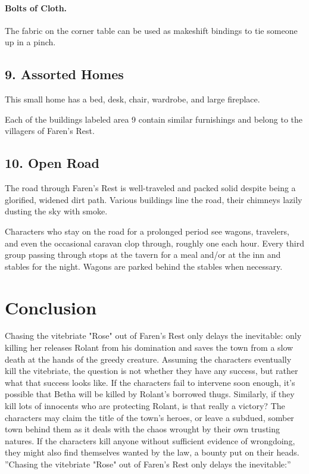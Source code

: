 \documentclass[10pt,a4paper,twoside,twocolumn,openany,bg=print,nodeprecatedcode]{dndbook}
\begin{document}
\paragraph{Bolts of Cloth.}
The fabric on the corner table can be used as makeshift bindings to tie someone up in a pinch.
\subsection{9. Assorted Homes}
\begin{DndReadAloud}{}
This small home has a bed, desk, chair, wardrobe, and large fireplace.
\end{DndReadAloud}

Each of the buildings labeled area 9 contain similar furnishings and belong to the villagers of Faren's Rest.
\subsection{10. Open Road}
\begin{DndReadAloud}{}
The road through Faren's Rest is well-traveled and packed solid despite being a glorified, widened dirt path. Various buildings line the road, their chimneys lazily dusting the sky with smoke.
\end{DndReadAloud}

Characters who stay on the road for a prolonged period see wagons, travelers, and even the occasional caravan clop through, roughly one each hour. Every third group passing through stops at the tavern for a meal and/or at the inn and stables for the night. Wagons are parked behind the stables when necessary.
\section{Conclusion}
Chasing the vitebriate "Rose" out of Faren's Rest only delays the inevitable: only killing her releases Rolant from his domination and saves the town from a slow death at the hands of the greedy creature. Assuming the characters eventually kill the vitebriate, the question is not whether they have any success, but rather what that success looks like.
If the characters fail to intervene soon enough, it's possible that Betha will be killed by Rolant's borrowed thugs. Similarly, if they kill lots of innocents who are protecting Rolant, is that really a victory? The characters may claim the title of the town's heroes, or leave a subdued, somber town behind them as it deals with the chaos wrought by their own trusting natures. If the characters kill anyone without sufficient evidence of wrongdoing, they might also find themselves wanted by the law, a bounty put on their heads.
\DndQuote%
{}
{''Chasing the vitebriate "Rose" out of Faren's Rest only delays the inevitable:''}
{}
\end{document}

